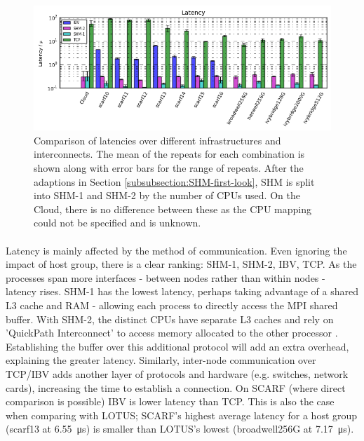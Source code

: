 \documentclass{article}
\begin{document}
            \begin{figure}[H]
                \centering
                \includegraphics[width=\textwidth]{compare_latency-hostgroup}
                \caption{Comparison of latencies over different infrastructures and interconnects. The mean of the repeats for each combination is shown along with error bars for the range of repeats. After the adaptions in Section \ref{subsubsection:SHM-first-look}, SHM is split into SHM-1 and SHM-2 by the number of CPUs used. On the Cloud, there is no difference between these as the CPU mapping could not be specified and is unknown.}
                \label{fig:compare_latency-hostgroup}
            \end{figure}

            \paragraph{}
            Latency is mainly affected by the method of communication. Even ignoring the impact of host group, there is a clear ranking: SHM-1, SHM-2, IBV, TCP. As the processes span more interfaces - between nodes rather than within nodes - latency rises. SHM-1 has the lowest latency, perhaps taking advantage of a shared L3 cache and RAM - allowing each process to directly access the MPI shared buffer. With SHM-2, the distinct CPUs have separate L3 caches and rely on 'QuickPath Interconnect' to access memory allocated to the other processor \cite{intel2009}. Establishing the buffer over this additional protocol will add an extra overhead, explaining the greater latency. Similarly, inter-node communication over TCP/IBV adds another layer of protocols and hardware (e.g. switches, network cards), increasing the time to establish a connection. On SCARF (where direct comparison is possible) IBV is lower latency than TCP. This is also the case when comparing with LOTUS; SCARF's highest average latency for a host group (scarf13 at \SI{6.55}{\micro\second}) is smaller than LOTUS's lowest (broadwell256G at \SI{7.17}{\micro\second}).
\end{document}
